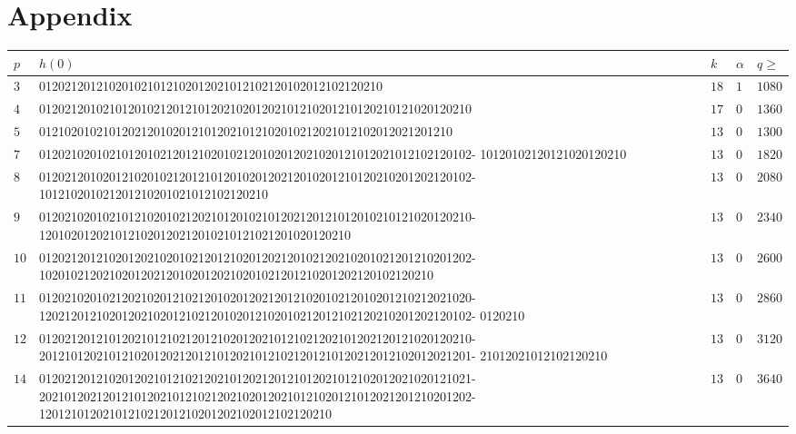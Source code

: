 \documentclass[12pt]{article}
\theoremstyle{definition}
\begin{document}

 

\appendix
\section{Appendix}
\begin{table}[H]
    \footnotesize
    \centering
    \begin{tabular}{ |C{0.25cm}|p{12cm}|C{0.25cm}|C{0.25cm}|p{0.8cm}| }
 \hline
 $p$ & $h(0)$ & $k$ & $\alpha$ & $q \ge$\\
 \hline
 $3$  & 012021201210201021012102012021012102120102012102120210 & $18$ & $1$ & $1080$\\
 \hline
 $4$  & 01202120102101201021201210120210201202101210201210120210121020120210 & $17$ & $0$ & $1360$\\
 \hline
 $5$  & 01210201021012021201020121012021012102010212021012102012021201210 & $13$ & $0$ & $1300$\\
 \hline
 $7$  & 01202102010210120102120121020102120102012021020121012021012102120102-
 10120102120121020120210 & $13$ & $0$ & $1820$\\
 \hline
 $8$  & 01202120102012102010212012101201020120212010201210120210201202120102-
        101210201021201210201021012102120210 & $13$ & $0$ & $2080$\\
 \hline
 $9$  & 01202102010210121020102120210120102101202120121012010210121020120210-
        1201020120210121020120212010210121021201020120210 & $13$ & $0$ & $2340$\\
 \hline
 $10$  & 01202120121020120210201021201210201202120102120210201021201210201202-
        10201021202102012021201020120210201021201210201202120102120210
 & $13$ & $0$ & $2600$\\
 \hline
 $11$  & 01202102010212021020121021201020120212012102010212010201210212021020-
         12021201210201202102012102120102012102010212012102120210201202120102-
         0120210
 & $13$ & $0$ & $2860$\\
 \hline
 $12$  & 01202120121012021012102120121020120210121021202101202120121020120210-
         20121012021012102012021201210120210121021201210120212012102012021201-
         21012021012102120210
 & $13$ & $0$ & $3120$\\
 \hline
 $14$  & 01202120121020120210121021202101202120121012021012102012021020121021-
         20210120212012101202101210212021020120210121020121012021201210201202-
         1201210120210121021201210201202102012102120210
 & $13$ & $0$ & $3640$\\
 \hline

\end{tabular}
\end{table}
\end{document}
